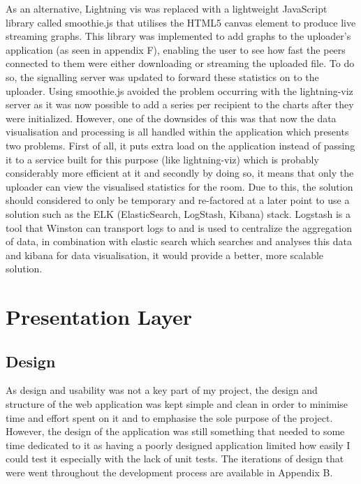\documentclass[]{report}
\begin{document}
				As an alternative, Lightning vis was replaced with a lightweight JavaScript library called smoothie.js that utilises the HTML5 canvas element to produce live streaming graphs. This library was implemented to add graphs to the uploader's application (as seen in appendix F), enabling the user to see how fast the peers connected to them were either downloading or streaming the uploaded file. To do so, the signalling server was updated to forward these statistics on to the uploader. Using smoothie.js avoided the problem occurring with the lightning-viz server as it was now possible to add a series per recipient to the charts after they were initialized. However, one of the downsides of this was that now the data visualisation and processing is all handled within the application which presents two problems. First of all, it puts extra load on the application instead of passing it to a service built for this purpose (like lightning-viz) which is probably considerably more efficient at it and secondly by doing so, it means that only the uploader can view the visualised statistics for the room. Due to this, the solution should considered to only be temporary and re-factored at a later point to use a solution such as the ELK (ElasticSearch, LogStash, Kibana) stack. Logstash is a tool that Winston can transport logs to and is used to centralize the aggregation of data, in combination with elastic search which searches and analyses this data and kibana for data visualisation, it would provide a better, more scalable solution.
			
		\section{Presentation Layer}
			\subsection{Design}		
			As design and usability was not a key part of my project, the design and structure of the web application was kept simple and clean in order to minimise time and effort spent on it and to emphasise the sole purpose of the project. However, the design of the application was still something that needed to some time dedicated to it as having a poorly designed application limited how easily I could test it especially with the lack of unit tests. The iterations of design that were went throughout the development process are available in Appendix B.
\end{document}
